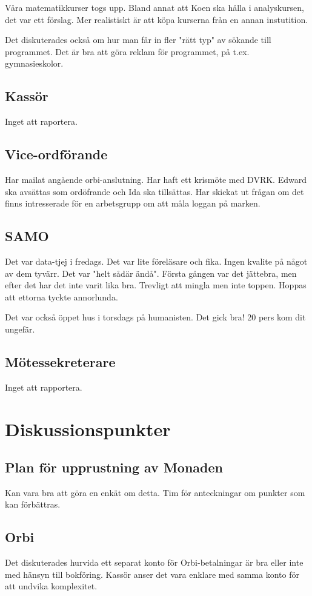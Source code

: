 \documentclass[protokoll]{dvd}
\begin{document}
Våra matematikkurser togs upp. Bland annat att Koen ska hålla i analyskursen, det var ett förslag. Mer realistiskt är att köpa kurserna från en annan instutition.

Det diskuterades också om hur man får in fler "rätt typ" av sökande till programmet. Det är bra att göra reklam för programmet, på t.ex. gymnasieskolor.


\subsection{Kassör}
Inget att raportera.

\subsection{Vice-ordförande}
Har mailat angående orbi-anslutning. Har haft ett krismöte med DVRK. Edward ska avsättas som ordöfrande och Ida ska tillsättas.
Har skickat ut frågan om det finns intresserade för en arbetsgrupp om att måla loggan på marken.

\subsection{SAMO}
Det var data-tjej i fredags. Det var lite föreläsare och fika. Ingen kvalite på något av dem tyvärr. Det var "helt sådär ändå".
Första gången var det jättebra, men efter det har det inte varit lika bra. Trevligt att mingla men inte toppen. Hoppas att ettorna tyckte annorlunda.

Det var också öppet hus i torsdags på humanisten. Det gick bra! 20 pers kom dit ungefär.

\subsection{Mötessekreterare}
Inget att rapportera.

\newpage


\section{Diskussionspunkter}

\subsection*{Plan för upprustning av Monaden}
Kan vara bra att göra en enkät om detta. Tim för anteckningar om punkter som kan förbättras.

\subsection*{Orbi}
Det diskuterades hurvida ett separat konto för Orbi-betalningar är bra eller inte med hänsyn till bokföring.
Kassör anser det vara enklare med samma konto för att undvika komplexitet.
\end{document}

